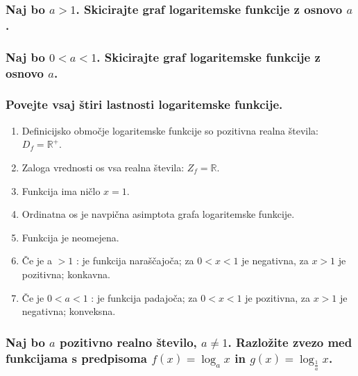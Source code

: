 \documentclass{article}
\begin{document}
\subsubsection*{Naj bo $a>1$. Skicirajte graf logaritemske funkcije z osnovo $a$.}


\subsubsection*{Naj bo $0<a<1$. Skicirajte graf logaritemske funkcije z osnovo $a$.}


\subsubsection*{Povejte vsaj štiri lastnosti logaritemske funkcije.}

\begin{enumerate}
  \item Definicijsko območje logaritemske funkcije so pozitivna realna števila: $D_{f}=\mathbb{R}^{+}$.

  \item Zaloga vrednosti os vsa realna števila: $Z_{f}=\mathbb{R}$.

  \item Funkcija ima ničlo $x=1$.

  \item Ordinatna os je navpična asimptota grafa logaritemske funkcije.

  \item Funkcija je neomejena.

  \item Če je a $>1$ : je funkcija naraščajoča; za $0<x<1$ je negativna, za $x>1$ je pozitivna; konkavna.

  \item Če je $0<a<1$ : je funkcija padajoča; za $0<x<1$ je pozitivna, za $x>1$ je negativna; konveksna.

\end{enumerate}

\subsubsection*{Naj bo $a$ pozitivno realno število, $a \neq 1$. Razložite zvezo med funkcijama s predpisoma $f(x)=\log _{a} x$ in $g(x)=\log _{\frac{1}{a}} x$.}
\end{document}
